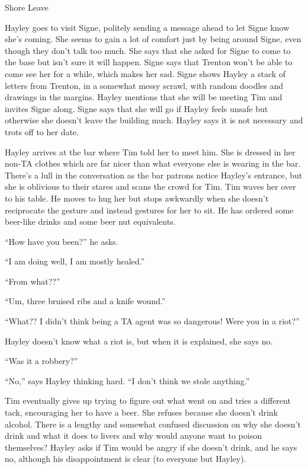  {\LARGE Shore Leave } 



Hayley goes to visit Signe, politely sending a message ahead to let Signe know she's coming.  She seems to gain a lot of comfort just by being around Signe, even though they don't talk too much.  She says that she asked for Signe to come to the base but isn't sure it will happen.  Signe says that Trenton won't be able to come see her for a while, which makes her sad.  Signe shows Hayley a stack of letters from Trenton, in a somewhat messy scrawl, with random doodles and drawings in the margins.  Hayley mentions that she will be meeting Tim and invites Signe along.  Signe says that she will go if Hayley feels unsafe but otherwise she doesn't leave the building much.  Hayley says it is not necessary and trots off to her date.



Hayley arrives at the bar where Tim told her to meet him.  She is dressed in her non-TA clothes which are far nicer than what everyone else is wearing in the bar.  There's a lull in the conversation as the bar patrons notice Hayley's entrance, but she is oblivious to their stares and scans the crowd for Tim.  Tim waves her over to his table.  He moves to hug her but stops awkwardly when she doesn't reciprocate the gesture and instead gestures for her to sit.  He has ordered some beer-like drinks and some beer nut equivalents.

``How have you been?'' he asks.

``I am doing well, I am mostly healed.''

``From what??''

``Um, three bruised ribs and a knife wound.''

``What??  I didn't think being a TA agent was so dangerous!  Were you in a riot?''

Hayley doesn't know what a riot is, but when it is explained, she says no.

``Was it a robbery?''

``No,'' says Hayley thinking hard.  ``I don't think we stole anything.''

Tim eventually gives up trying to figure out what went on and tries a different tack, encouraging her to have a beer.   She refuses because she doesn't drink alcohol.  There is a lengthy and somewhat confused discussion on why she doesn't drink and what it does to livers and why would anyone want to poison themselves?  Hayley asks if Tim would be angry if she doesn't drink, and he says no, although his disappointment is clear (to everyone but Hayley).  




